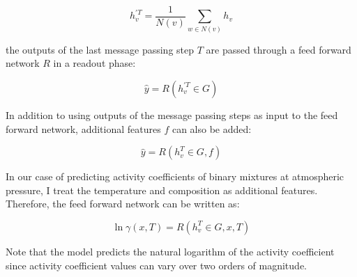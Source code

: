 \begin{equation}
    h_v^{'T} = \frac{1}{N(v)} \sum_{w\in N(v)} h_v
\end{equation}

the outputs of the last message passing step $T$ are passed through a feed forward network $R$ in a readout phase:
 
\begin{equation}
    \hat y = R(h_v^{'T} \in G)
\end{equation}

In addition to using outputs of the message passing steps as input to the feed forward network, additional features $f$ can also be added:

\begin{equation}
    \hat y = R(h_v^T \in G, f)
\end{equation}

In our case of predicting activity coefficients of binary mixtures at atmospheric pressure, I treat the temperature and composition as additional features. Therefore, the feed forward network can be written as:

\begin{equation}
   \ln \gamma(x,T)= R(h_v^T \in G, x, T)
\end{equation}

Note that the model predicts the natural logarithm of the activity coefficient since activity coefficient values can vary over two orders of magnitude.



